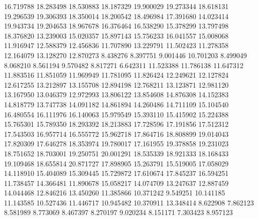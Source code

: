16.719788
18.283498
18.530883
18.187329
19.900029
19.273344
18.618131
19.296539
19.306393
18.350014
18.200542
18.496984
17.391680
14.023414
19.943734
19.204653
18.967678
16.376464
16.538290
15.378299
13.797498
18.376820
13.239003
15.020357
15.897143
15.756233
16.041557
15.008068
11.916947
12.588379
12.456836
11.707890
13.229791
11.502423
11.278358
12.164079
13.128270
12.870273
8.438276
8.397751
9.001446
10.701203
8.499049
8.068210
8.561194
9.570482
8.817271
6.642311
11.523388
11.786138
11.647312
11.883516
11.851059
11.969949
11.781095
11.826424
12.249621
12.127824
12.617255
13.212897
13.155708
12.894198
12.768211
13.123871
12.981120
13.167950
13.046379
12.972993
13.806122
13.854608
14.876308
14.152383
14.818779
13.747738
14.091182
14.861894
14.260486
14.711109
15.104540
16.480554
16.111976
16.140063
15.979549
15.393110
15.415902
15.224388
15.765301
15.789350
18.293392
18.213883
17.728596
17.191856
17.512312
17.543503
16.957714
16.555772
15.962718
17.864716
18.808899
19.014043
17.820309
17.646278
18.353974
19.780017
17.161955
19.378858
19.231023
18.751652
18.703001
19.250751
20.001291
18.535339
18.921333
18.168433
19.109468
18.655814
20.871727
17.898905
15.263791
15.519005
17.058029
14.118910
15.404089
15.309445
15.729872
17.610674
17.845237
16.594251
11.738457
14.366481
11.890678
15.058217
14.074709
13.247637
12.887459
14.044468
12.846216
13.450260
11.385866
10.371242
9.549251
10.141185
11.143585
10.527436
11.446717
10.945482
10.370911
13.348414
8.622908
7.862123
8.581989
8.773069
8.467397
8.270197
9.020234
8.151171
7.303423
8.957123
